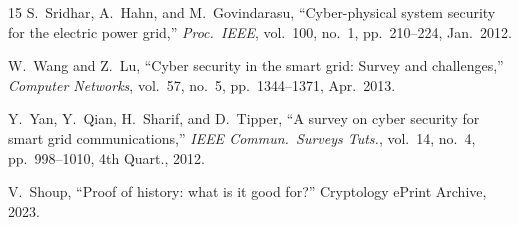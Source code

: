 \documentclass[10pt,twocolumn,journal]{IEEEtran}
\begin{document}
\begin{thebibliography}{15}
S.~Sridhar, A.~Hahn, and M.~Govindarasu,
``Cyber-physical system security for the electric power grid,''
\emph{Proc.\ IEEE}, vol.~100, no.~1, pp.~210--224, Jan.~2012.

W.~Wang and Z.~Lu,
``Cyber security in the smart grid: Survey and challenges,''
\emph{Computer Networks}, vol.~57, no.~5, pp.~1344--1371, Apr.~2013.

Y.~Yan, Y.~Qian, H.~Sharif, and D.~Tipper,
``A survey on cyber security for smart grid communications,''
\emph{IEEE Commun.\ Surveys Tuts.}, vol.~14, no.~4, pp.~998--1010, 4th Quart., 2012.

V.~Shoup,
``Proof of history: what is it good for?''
Cryptology ePrint Archive, 2023.

\end{thebibliography}
\end{document}
